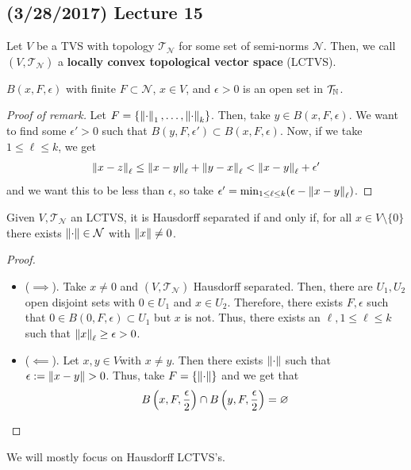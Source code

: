 \documentclass[11pt,leqno,oneside]{amsbook}
\numberwithin{thm}{section}
\newcommand{\Top}{\mathcal{T}} %
\newcommand{\cN}{\mathcal{N}}
\newcommand{\norms}{\cN}
\renewcommand{\emptyset}{\varnothing}
\renewcommand{\de}{\textbf} %
\begin{document}
\subsection*{(3/28/2017) Lecture 15}
\begin{defn}
  Let \(V\) be a TVS with topology \(\Top_\norms\) for some set of
  semi-norms \(\norms\). Then, we call \((V,\Top_\norms)\) a
  \de{locally convex topological vector space} (LCTVS).
\end{defn}
\begin{rmk}
  \(B(x,F,\epsilon)\) with finite \(F \subset \norms\), \(x \in
  V\), and \(\epsilon > 0\) is an open set in \(\Top_\N\).
\end{rmk}
\begin{proof}[Proof of remark]
  Let \(F = \{\norm_1, \ldots, \norm_k\}\). Then, take \(y \in
  B(x,F,\epsilon)\). We want to find some \(\epsilon' > 0\) such that
  \(B(y,F,\epsilon') \subset B(x,F,\epsilon)\). Now, if we take \(1
  \leq \ell \leq k\), we get \[
    \norm[x-z]_\ell \leq \norm[x-y]_\ell + \norm[y-x]_\ell <
    \norm[x-y]_\ell + \epsilon'
  \]
  and we want this to be less than \(\epsilon\), so take \(\epsilon' =
  \min_{1 \leq \ell \leq k}(\epsilon - \norm[x-y]_\ell)\).
\end{proof}
\begin{prop}
  Given \(V,\Top_\norms\) an LCTVS, it is Hausdorff separated if and
  only if, for all \(x \in V \setminus \{0\}\) there exists \(\norm
  \in \norms\) with \(\norm[x] \neq 0\).
\end{prop}
\begin{proof}
  \begin{itemize}
  \item (\(\implies\)). Take \(x \neq 0\) and \((V,\Top_\norms)\)
    Hausdorff separated. Then, there are \(U_1,U_2\) open disjoint
    sets with \(0 \in U_1\) and \(x \in U_2\). Therefore, there exists
    \(F,\epsilon\) such that \(0 \in B(0,F,\epsilon) \subset U_1\) but
    \(x\) is not. Thus, there exists an \(\ell, 1 \leq \ell \leq k\)
    such that \(\norm[x]_\ell \geq \epsilon > 0\).
  \item (\(\impliedby\)). Let \(x,y \in V\)with \(x \neq y\). Then
    there exists \(\norm\) such that \(\epsilon := \norm[x-y] >
    0\). Thus, take \(F = \{\norm\}\) and we get that \[
      B\left(x,F,\frac{\epsilon}{2}\right) \intersect B\left(y,F,\frac{\epsilon}{2}\right) = \emptyset
    \]
  \end{itemize}
\end{proof}
We will mostly focus on Hausdorff LCTVS's.
\end{document}
